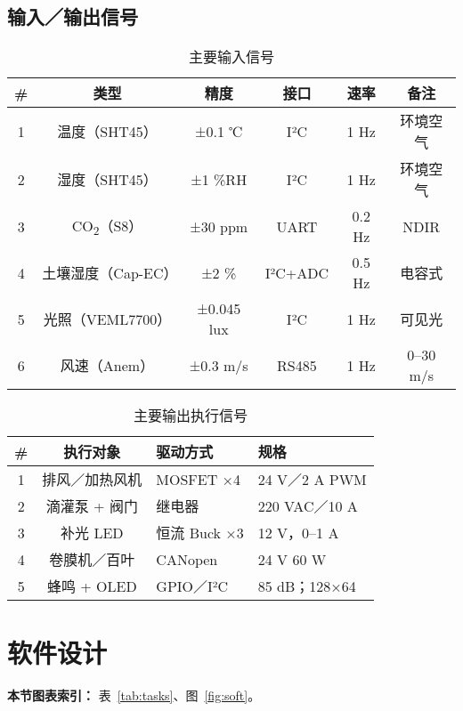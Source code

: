 \documentclass[UTF8,a4paper]{ctexart}
\newcommand{\tabfont}{\zihao{-5}}
\begin{document}
\subsection{输入／输出信号}
\begin{table}[htbp]
    \centering
    \caption{主要输入信号}
    \label{tab:inputs}
    \tabfont
    \begin{tabular}{@{}cccccc@{}}
        \toprule
        \# & 类型 & 精度 & 接口 & 速率 & 备注 \\ \midrule
        1 & 温度（SHT45） & ±0.1 ℃ & I²C & 1 Hz & 环境空气 \\
        2 & 湿度（SHT45） & ±1 \%RH & I²C & 1 Hz & 环境空气 \\
        3 & CO\textsubscript{2}（S8） & ±30 ppm & UART & 0.2 Hz & NDIR \\
        4 & 土壤湿度（Cap-EC） & ±2 \% & I²C+ADC & 0.5 Hz & 电容式 \\
        5 & 光照（VEML7700） & ±0.045 lux & I²C & 1 Hz & 可见光 \\
        6 & 风速（Anem） & ±0.3 m/s & RS485 & 1 Hz & 0–30 m/s \\ \bottomrule
    \end{tabular}
\end{table}

\begin{table}[htbp]
    \centering
    \caption{主要输出执行信号}
    \label{tab:outputs}
    \tabfont
    \begin{tabular}{@{}ccp{3cm}p{4cm}@{}}
        \toprule
        \# & 执行对象 & 驱动方式 & 规格 \\ \midrule
        1 & 排风／加热风机 & MOSFET ×4 & 24 V／2 A PWM \\
        2 & 滴灌泵 + 阀门 & 继电器 & 220 VAC／10 A \\
        3 & 补光 LED & 恒流 Buck ×3 & 12 V，0–1 A \\
        4 & 卷膜机／百叶 & CANopen & 24 V 60 W \\
        5 & 蜂鸣 + OLED & GPIO／I²C & 85 dB；128×64 \\ \bottomrule
    \end{tabular}
\end{table}

\section{软件设计}
\textbf{本节图表索引：} 表~\ref{tab:tasks}、图~\ref{fig:soft}。
\end{document}
